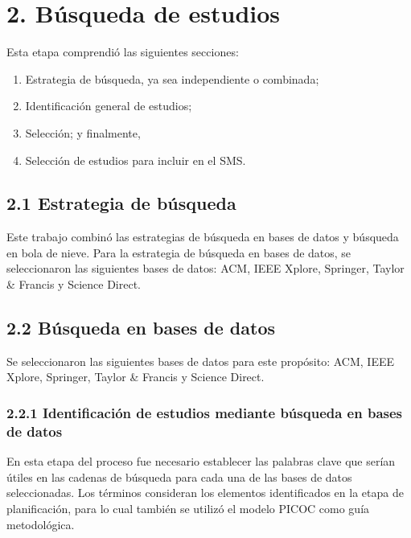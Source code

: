 

\section*{2. Búsqueda de estudios}
\label{sec:busquedaEstudios}

Esta etapa comprendió las siguientes secciones: 
\begin{enumerate}
  \item Estrategia de búsqueda, ya sea independiente o combinada;
  \item Identificación general de estudios;
  \item Selección; y finalmente,
  \item Selección de estudios para incluir en el SMS.\end{enumerate}

\subsection*{2.1 Estrategia de búsqueda}
\label{subsec:estrategiaBusqueda}

Este trabajo combinó las estrategias de búsqueda en bases de datos y búsqueda en bola de nieve. 
Para la estrategia de búsqueda en bases de datos, se seleccionaron las siguientes bases de datos: ACM, IEEE Xplore, Springer, Taylor \& Francis y Science Direct.

\subsection*{2.2 Búsqueda en bases de datos}
\label{subsec:busquedaBasesDatos}
Se seleccionaron las siguientes bases de datos para este propósito: ACM, IEEE Xplore, Springer, Taylor \& Francis y Science Direct.

\subsubsection*{2.2.1 Identificación de estudios mediante búsqueda en bases de datos}
\label{subsubsec:identificacionEstudios}
En esta etapa del proceso fue necesario establecer las palabras clave que serían útiles en las cadenas de búsqueda para cada una de las bases de datos seleccionadas. 
Los términos consideran los elementos identificados en la etapa de planificación, para lo cual también se utilizó el modelo PICOC como guía metodológica.

